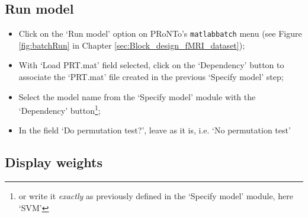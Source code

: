 \begin{itemize}
\end{itemize}


\subsection{Run model}

\begin{itemize}

    \item Click on the `Run model' option on PRoNTo's {\tt matlabbatch} menu (see Figure \ref{fig:batchRun} in Chapter \ref{sec:Block_design_fMRI_dataset});
    
   	\item  With `Load PRT.mat' field selected, click on the `Dependency' button to associate the `PRT.mat' file created in the previous `Specify model' step;

    \item Select the model name from the `Specify model' module with the `Dependency' button\footnote{or write it {\it exactly} as previously defined in the `Specify model' module, here `SVM'};
    
    \item In the field `Do permutation test?', leave as it is, i.e. `No permutation test' 

\end{itemize}


\subsection{Display weights}

